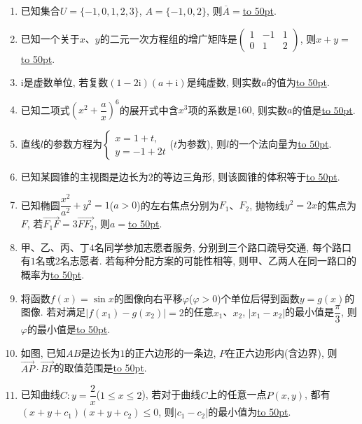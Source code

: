 \documentclass[10pt,a4paper]{article}
\newcommand{\blank}[1]{\underline{\hbox to #1pt{}}}
\begin{document}
\begin{enumerate}[1.]
\item 已知集合$U=\{-1,0,1,2,3\}$, $A=\{-1,0,2\}$, 则$\overline{A}=$\blank{50}.
\item 已知一个关于$x$、$y$的二元一次方程组的增广矩阵是$\begin{pmatrix}
1 & -1 & 1  \\ 0 & 1 & 2  \end{pmatrix}$, 则$x+y=$\blank{50}.
\item $\mathrm{i}$是虚数单位, 若复数$(1-2\mathrm{i})(a+\mathrm{i})$是纯虚数, 则实数$a$的值为\blank{50}.
\item 已知二项式$(x^2+\dfrac ax)^6$的展开式中含$x^3$项的系数是$160$, 则实数$a$的值是\blank{50}.
\item 直线$l$的参数方程为$\begin{cases} x=1+t, \\ y=-1+2t \end{cases}$($t$为参数), 则$l$的一个法向量为\blank{50}.
\item 已知某圆锥的主视图是边长为$2$的等边三角形, 则该圆锥的体积等于\blank{50}.
\item 已知椭圆$\dfrac{x^2}{a^2}+y^2=1$($a>0$)的左右焦点分别为$F_1$、$F_2$, 抛物线$y^2=2x$的焦点为$F$, 若$\overrightarrow{F_1F}=3\overrightarrow{FF_2}$, 则$a=$\blank{50}.
\item 甲、乙、丙、丁$4$名同学参加志愿者服务, 分别到三个路口疏导交通, 每个路口有$1$名或$2$名志愿者. 若每种分配方案的可能性相等, 则甲、乙两人在同一路口的概率为\blank{50}.
\item 将函数$f(x)=\sin x$的图像向右平移$\varphi$($\varphi >0$)个单位后得到函数$y=g(x)$的图像. 若对满足$|f(x_1)-g(x_2)|=2$的任意$x_1$、$x_2$, $|x_1-x_2|$的最小值是$\dfrac{\pi }3$, 则$\varphi$的最小值是\blank{50}.
\item 如图, 已知$AB$是边长为$1$的正六边形的一条边,
$P$在正六边形内(含边界), 则$\overrightarrow{AP}\cdot \overrightarrow{BP}$的取值范围是\blank{50}.
\begin{center}
\end{center}
\item 已知曲线$C:y=\dfrac 2x$($1\le x\le 2$), 若对于曲线$C$上的任意一点$P(x,y)$, 都有$(x+y+c_1)(x+y+c_2)\le 0$, 则$|c_1-c_2|$的最小值为\blank{50}.

\end{enumerate}
\end{document}
